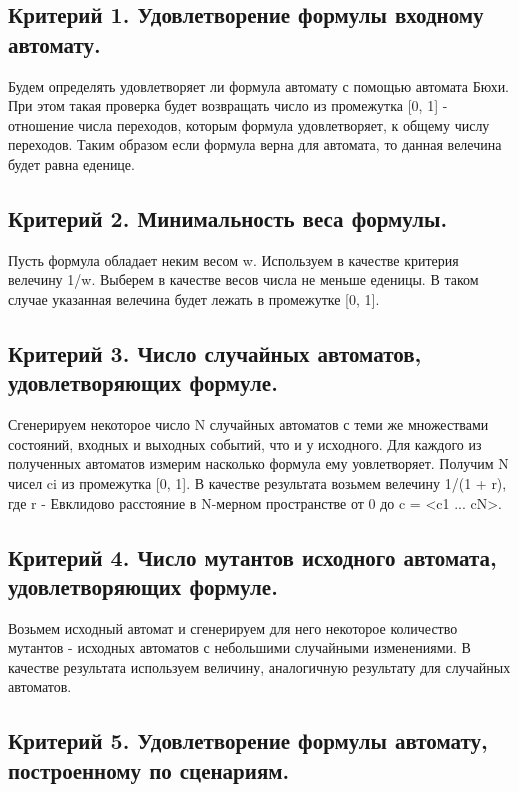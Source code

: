 \documentclass[12pt]{article}
\begin{document}
\subsection*{Критерий 1. Удовлетворение формулы входному автомату.}

Будем определять удовлетворяет ли формула автомату с помощью автомата Бюхи. При этом такая проверка будет возвращать
число из промежутка [0, 1] - отношение числа переходов, которым формула удовлетворяет, к общему числу переходов.
Таким образом если формула верна для автомата, то данная велечина будет равна еденице.

\subsection*{Критерий 2. Минимальность веса формулы.}

Пусть формула обладает неким весом w. Используем в качестве критерия велечину 1/w. Выберем в качестве весов числа не
меньше еденицы. В таком случае указанная велечина будет лежать в промежутке [0, 1].

\subsection*{Критерий 3. Число случайных автоматов, удовлетворяющих формуле.}

Сгенерируем некоторое число N случайных автоматов с теми же множествами состояний, входных и выходных событий, что и
у исходного. Для каждого из полученных автоматов измерим насколько формула ему уовлетворяет. Получим N чисел ci из
промежутка [0, 1]. В качестве результата возьмем велечину 1/(1 + r), где r - Евклидово расстояние в N-мерном
пространстве от 0 до c = <c1 ... cN>.

\subsection*{Критерий 4. Число мутантов исходного автомата, удовлетворяющих формуле.}

Возьмем исходный автомат и сгенерируем для него некоторое количество мутантов - исходных автоматов с небольшими
случайными изменениями. В качестве результата используем величину, аналогичную результату для случайных автоматов.

\subsection*{Критерий 5. Удовлетворение формулы автомату, построенному по сценариям.}
\end{document}
